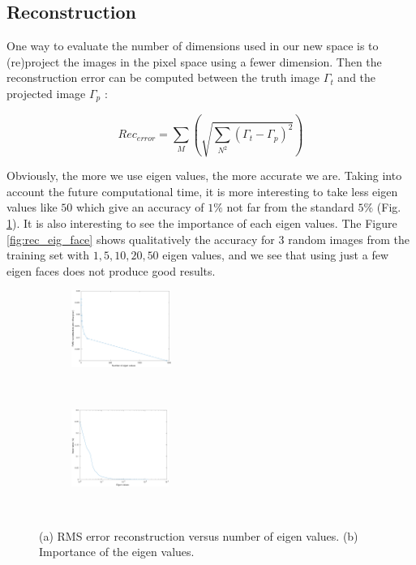 \documentclass[runningheads,a4paper]{llncs}
\begin{document}
\subsection{Reconstruction}

One way to evaluate the number of dimensions used in our new space is to (re)project the images in the pixel space using a fewer dimension. Then the reconstruction error can be computed between the truth image $\Gamma_{t}$ and the projected image $\Gamma_p$ :

\begin{equation}
Rec_{error}=\sum_M (\sqrt{\sum_{N^2}(\Gamma_{t}-\Gamma_p)^2})
\end{equation}

Obviously, the more we use eigen values, the more accurate we are. Taking into account the future computational time, it is more interesting to take less eigen values like $50$ which give an accuracy of  $1\%$ not far from the standard $5\%$ (Fig. \ref{fig:error_rec_eig}). It is also interesting to see the importance of each eigen values. The Figure \ref{fig:rec_eig_face} shows qualitatively the accuracy for $3$ random images from the training set with $1,5,10,20,50$ eigen values, and we see that using just a few eigen faces does not produce good results.

\begin{figure}
\centering
    \begin{subfigure}[b]{0.4\textwidth}
      \centering
	\includegraphics[height=2.5cm]{Figures/error_rec_eig}
	\caption{}
    \end{subfigure}~
\begin{subfigure}[b]{0.4\textwidth}
      \centering
      \includegraphics[height=2.5cm]{Figures/importance_eigen}
      \caption{}
    \end{subfigure}~
\caption{(a) RMS error reconstruction versus number of eigen values. (b) Importance of the eigen values.}
\label{fig:error_rec_eig}
\end{figure}
\end{document}
